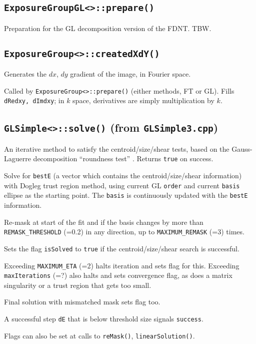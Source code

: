 \documentclass[useAMS,usenatbib,usegraphicx]{mn2e}
\begin{document}
\subsection{\texttt{ExposureGroupGL<>::prepare()}}
Preparation for the GL decomposition version of the FDNT.  TBW.


\subsection{\texttt{ExposureGroup<>::createdXdY()}}
Generates the $dx$, $dy$ gradient of the image, in Fourier space.

Called by {\tt ExposureGroup<>::prepare()} (either methods, FT or GL).  
Fills {\tt dRedxy, dImdxy}; in $k$ space, derivatives are simply multiplication by $k$.


\subsection{\texttt{GLSimple<>::solve()} (from {\tt GLSimple3.cpp})}
An iterative method to satisfy the centroid/size/shear tests, based on the Gauss-Laguerre 
decomposition ``roundness test'' \citep{bernstein/jarvis:2002}.  Returns {\tt true} on success.

Solve for {\tt bestE} (a vector which contains the centroid/size/shear information) 
with Dogleg trust region method, using current GL {\tt order} and current {\tt basis} ellipse
as the starting point.  The {\tt basis} is continuously updated with the {\tt bestE} information.

Re-mask at start of the fit and if the basis changes by more than {\tt REMASK\_THRESHOLD} (=0.2)
in any direction, up to {\tt MAXIMUM\_REMASK} (=3) times.

Sets the flag {\tt isSolved} to {\tt true} if the centroid/size/shear search is successful.

Exceeding {\tt MAXIMUM\_ETA} (=2) halts iteration and sets flag for this.   Exceeding 
{\tt maxIterations} (=?) also halts and sets convergence flag, as does a matrix 
singularity or a trust region that gets too small.

Final solution with mismatched mask sets flag too.

A successful step {\tt dE} that is below threshold size signals {\tt success}.

Flags can also be set at calls to {\tt reMask()}, {\tt linearSolution()}.
\end{document}
